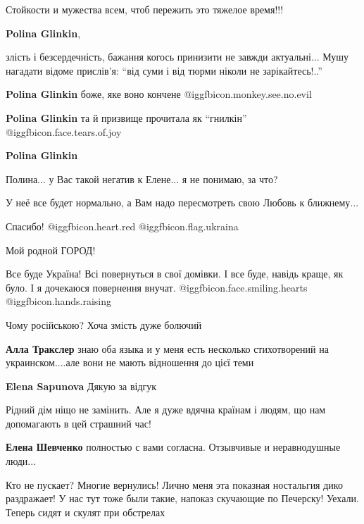 \begin{itemize}
\begin{itemize}
Стойкости и мужества всем, чтоб пережить это тяжелое время!!!

\textbf{Polina Glinkin}, 

злість і безсердечність, бажання когось принизити не завжди актуальні... Мушу
нагадати відоме прислів'я: \enquote{від суми і від тюрми ніколи не зарікайтесь!..}

\textbf{Polina Glinkin} боже, яке воно кончене @igg{fbicon.monkey.see.no.evil} 

\textbf{Polina Glinkin} та й призвище прочитала як \enquote{гнилкін} @igg{fbicon.face.tears.of.joy} 

\textbf{Polina Glinkin} 

Полина... у Вас такой негатив к Елене... я не понимаю, за что?

У неё все будет нормально, а Вам надо пересмотреть свою Любовь к ближнему...

\end{itemize} %

Спасибо! @igg{fbicon.heart.red} @igg{fbicon.flag.ukraina}

Мой родной ГОРОД!

Все буде Україна! Всі повернуться в свої домівки. І все буде, навідь краще, як було. І я дочекаюся повернення внучат. @igg{fbicon.face.smiling.hearts}  @igg{fbicon.hands.raising} 

Чому російською? Хоча змість дуже болючий

\begin{itemize} %
\textbf{Алла Тракслер} знаю оба языка и у меня есть несколько стихотворений на украинском....але вони не мають відношення до цієї теми

\textbf{Elena Sapunova} Дякую за відгук
\end{itemize} %


Рідний дім ніщо не замінить. Але я дуже вдячна країнам і людям, що нам допомагають в цей страшний час!

\textbf{Елена Шевченко} полностью с вами согласна. Отзывчивые и неравнодушные люди...


Кто не пускает? Многие вернулись! Лично меня эта показная ностальгия дико
раздражает! У нас тут тоже были такие, напоказ скучающие по Печерску! Уехали.
Теперь сидят и скулят при обстрелах


\end{itemize}
